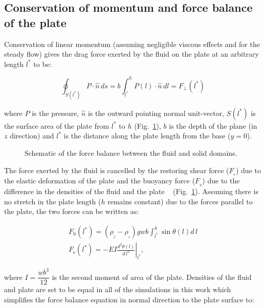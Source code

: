 \documentclass[preprint, letterpaper, nobibnotes, aps, superscriptaddress,prb]{revtex4-1}
\begin{document}
\subsection{Conservation of momentum and force balance of the plate}


Conservation of linear momentum (assuming negligible viscous effects and for the steady flow) gives the drag force exerted by the fluid on the plate at an arbitrary length $l^{*}$ to be:

\begin{equation}
\oint_{S(l^{*})}P\cdot\hat{n}\,ds = b\int_{l^{*}}^{h}P(l)\cdot\hat{n}\,dl = F_{\perp}(l^{*})
\end{equation}\label{lin_momentum_eq}

where $P$ is the pressure, $\hat{n}$ is the outward pointing normal unit-vector, $S(l^{*})$ is the surface area of the plate from $l^{*}$ to $h$ (Fig.~\ref{fig:force_balance}), $b$ is the depth of the plane (in $z$ direction) and $l^{*}$ is the distance along the plate length from the base ($y=0$). 

\begin{figure}[h]
\centering {}
\caption{Schematic of the force balance between the fluid and solid domains.}\protect\label{fig:force_balance} 
\end{figure}

The force exerted by the fluid is cancelled by the restoring shear force ($F_{\mathrm{_{e}}}$) due to the elastic deformation of the plate and the buoyancy force ($F_{\mathrm{_{b}}}$) due to the difference in the densities of the fluid and the plate ~\cite{Luhar11} (Fig.~\ref{fig:force_balance}). Assuming there is no stretch in the plate length ($h$ remains constant) due to the forces parallel to the plate, the two forces can be written as:

\begin{gather}
F_{\mathrm{{b}}}(l^{*})=(\rho_{_f}-\rho_{_s})gwb\int_{l^{*}}^{h}\sin\theta(l)d\,l \\[2ex]
F_{\mathrm{{e}}}(l^{*})=-EI\left.\frac{d^2\theta(l)}{d\,l^2}\right\vert_{l^{*}},
\end{gather}

where $I=\dfrac{wb^3}{12}$ is the second moment of area of the plate. Densities of the fluid and plate are set to be equal in all of the simulations in this work which simplifies the force balance equation in normal direction to the plate surface to:
\end{document}
